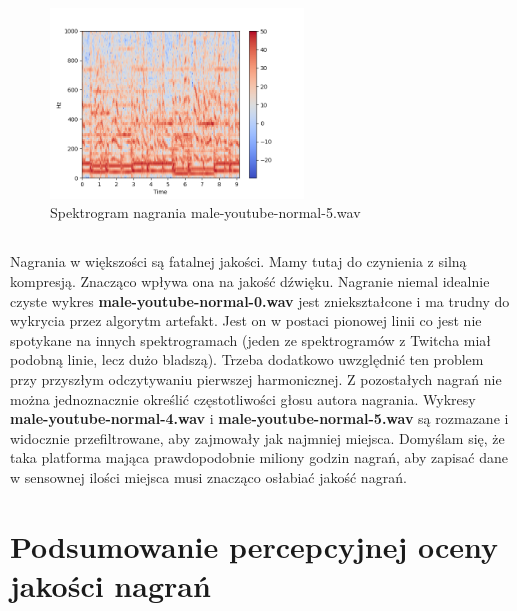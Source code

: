 \documentclass[a4paper,12pt]{extarticle}
\begin{document}
\begin{figure}[h]
\centering
\includegraphics[width=0.6\textwidth]{youtube-2}
\caption{Spektrogram nagrania male-youtube-normal-5.wav}
\end{figure}

\newpage

\subsection*{}
Nagrania w większości są fatalnej jakości. Mamy tutaj do czynienia z silną kompresją. Znacząco wpływa ona na jakość dźwięku. Nagranie niemal idealnie czyste wykres \textbf{male-youtube-normal-0.wav} jest zniekształcone i ma trudny do wykrycia przez algorytm artefakt. Jest on w postaci pionowej linii co jest nie spotykane na innych spektrogramach (jeden ze spektrogramów z Twitcha miał podobną linie, lecz dużo bladszą). Trzeba dodatkowo uwzględnić ten problem przy przyszłym odczytywaniu pierwszej harmonicznej. Z pozostałych nagrań nie można jednoznacznie określić częstotliwości głosu autora nagrania. Wykresy \textbf{male-youtube-normal-4.wav} i \textbf{male-youtube-normal-5.wav} są rozmazane i widocznie przefiltrowane, aby zajmowały jak najmniej miejsca. Domyślam się, że taka platforma mająca prawdopodobnie miliony godzin nagrań, aby zapisać dane w sensownej ilości miejsca musi znacząco osłabiać jakość nagrań.

\newpage

\section*{Podsumowanie percepcyjnej oceny jakości nagrań}
\end{document}
